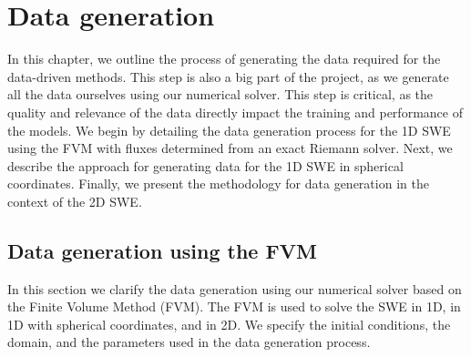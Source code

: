 \chapter{Data generation}\label{ch:method}
In this chapter, we outline the process of generating the data required for the data-driven methods.
This step is also a big part of the project, as we generate all the data ourselves using our numerical solver.
This step is critical, as the quality and relevance of the data directly impact the training and performance of the models.
We begin by detailing the data generation process for the 1D SWE using the FVM with fluxes determined from an exact Riemann solver.
Next, we describe the approach for generating data for the 1D SWE in spherical coordinates.
Finally, we present the methodology for data generation in the context of the 2D SWE.


\section{Data generation using the FVM}\label{sec:data_generation_fvm}
In this section we clarify the data generation using our numerical solver based on the Finite Volume Method (FVM).
The FVM is used to solve the SWE in 1D, in 1D with spherical coordinates, and in 2D.
We specify the initial conditions, the domain, and the parameters used in the data generation process.

